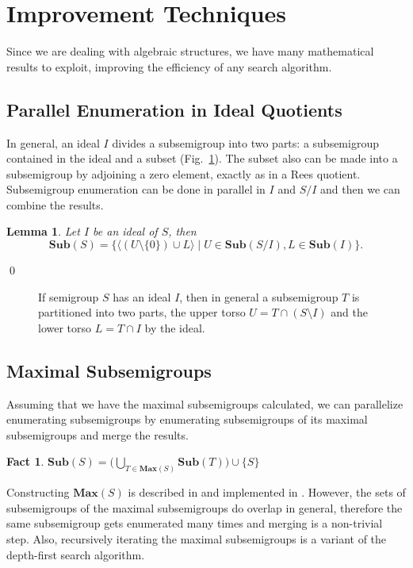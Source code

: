 \documentclass{amsart}
\newcommand{\Sub}{\mathbf{Sub}}
\newcommand{\Max}{\mathbf{Max}}
\theoremstyle{plain}
\newtheorem{lemma}[theorem]{Lemma}
\newtheorem{fact}[theorem]{Fact}
\theoremstyle{definition}
\begin{document}
\section{Improvement Techniques}
Since we are dealing with algebraic structures, we have many mathematical results to exploit, improving the efficiency of any  search algorithm.
\subsection{Parallel Enumeration in Ideal Quotients}
In general, an ideal $I$ divides a subsemigroup into two parts: a subsemigroup contained in the ideal and a subset (Fig.\ \ref{fig:torsos}).
The subset also can be made into a subsemigroup by adjoining a zero element, exactly as in a Rees quotient. 
Subsemigroup enumeration can be done in parallel in $I$ and $S/I$  and then  we can combine the results.

\begin{lemma}
Let $I$ be an ideal of $S$, then $$\Sub(S)=\big\{\langle (U\setminus\{0\})\cup L \rangle\mid U\in \Sub(S/I), L\in\Sub(I)\big\}.$$
\end{lemma}
\proof
\qed

\begin{figure}
\begin{center}

\caption{If semigroup $S$ has an ideal $I$, then in general a subsemigroup $T$ is partitioned into two parts, the upper torso $U=T\cap (S\setminus I)$ and the lower torso $L=T\cap I$ by the ideal.}
\label{fig:torsos}
\end{center}
\end{figure}

\subsection{Maximal Subsemigroups}
Assuming that we have the maximal subsemigroups calculated, we can parallelize enumerating subsemigroups by enumerating subsemigroups of its maximal subsemigroups and merge the results.
\begin{fact}
$\Sub(S)=\big( \bigcup_{T\in \Max(S)}\Sub(T)\big)\cup \{S\}$
\end{fact}
\noindent Constructing $\Max(S)$ is described in \cite{MaxSubSemi} and implemented in \cite{Semigroups}.
However, the sets of subsemigroups of the maximal subsemigroups do overlap in general, therefore the same subsemigroup gets enumerated many times and merging is a non-trivial step.
Also, recursively iterating the maximal subsemigroups is a variant of the depth-first search algorithm.  
\end{document}

